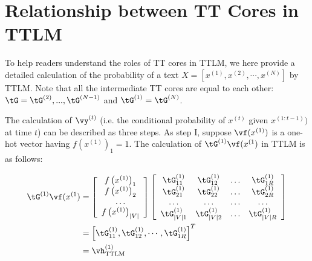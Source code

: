 \section{Relationship between TT Cores in TTLM}
\label{sec: relationship}

To help readers understand the roles of TT cores in TTLM, we here provide a detailed calculation of the probability of a text $X = [x^{(1)}, x^{(2)}, \cdots ,x^{(N)}]$ by TTLM. Note that all the intermediate TT cores are equal to each other: $\tG = \tG^{(2)},...,\tG^{(N-1)}$ and $\tG^{(1)} = \tG^{(N)}$. 

The calculation of $\vy^{(t)}$ (i.e. the conditional probability of $x^{(t)}$ given  $x^{(1:t-1)})$ at time $t$) can be described as three steps. As step I, suppose $\vf(x^{(1)})$ is a one-hot vector having $f(x^{(1)})_1 = 1$. The calculation of $\tG^{(1)}\vf(x^{(1})$ in TTLM is as follows:

\begin{align}
\tG^{(1)}\vf(x^{(1}) &= 
\left[\begin{array}{c}
f\left(x^{(1)}\right)_1 \\
f\left(x^{(1)}\right)_2 \\
\ldots \\
f\left(x^{(1)}\right)_{|V|}
\end{array}\right] \left[\begin{array}{cccc}
\tG_{11}^{(1)} & \tG_{12}^{(1)} & \ldots & \tG_{1 R}^{(1)} \\
\tG_{21}^{(1)} & \tG_{22}^{(1)} & \ldots & \tG_{2 R}^{(1)} \\
\ldots & \ldots & \ldots & \ldots \\
\tG_{|V| 1}^{(1)} & \tG_{|V| 2}^{(1)} & \ldots & \tG_{|V| R}^{(1)}
\end{array}\right] \nonumber \\ 
&=\left[\tG_{11}^{(1)}, \tG_{12}^{(1)}, \cdots, \tG_{1R}^{(1)}\right]^T \nonumber \\ 
&=\vh_{\textrm{TTLM}}^{(1)} \nonumber
\end{align}


